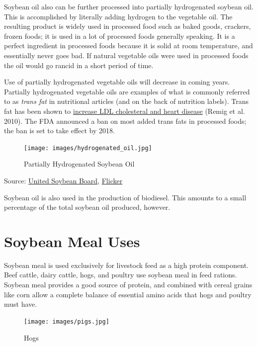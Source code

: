 \documentclass[
  letterpaper,
  DIV=11,
  numbers=noendperiod]{scrreprt}
\begin{document}
Soybean oil also can be further processed into partially hydrogenated
soybean oil. This is accomplished by literally adding hydrogen to the
vegetable oil. The resulting product is widely used in processed food
such as baked goods, crackers, frozen foods; it is used in a lot of
processed foods generally speaking. It is a perfect ingredient in
processed foods because it is solid at room temperature, and essentially
never goes bad. If natural vegetable oils were used in processed foods
the oil would go rancid in a short period of time.

Use of partially hydrogenated vegetable oils will decrease in coming
years. Partially hydrogenated vegetable oils are examples of what is
commonly referred to as \emph{trans fat} in nutritional articles (and on
the back of nutrition labels). Trans fat has been shown to
\href{http://www.fda.gov/ForConsumers/ConsumerUpdates/ucm372915.htm}{increase
LDL cholesteral and heart disease} (Remig et al. 2010). The FDA
announced a ban on most added trans fats in processed foods; the ban is
set to take effect by 2018.

\begin{figure}[H]

{\centering \texttt{[image: images/hydrogenated\_oil.jpg]}

}

\caption{Partially Hydrogenated Soybean Oil}

\end{figure}%

Source: \href{http://unitedsoybean.org/}{United Soybean Board},
\href{https://www.flickr.com/photos/unitedsoybean/16910795086/}{Flicker}

Soybean oil is also used in the production of biodiesel. This amounts to
a small percentage of the total soybean oil produced, however.

\section{Soybean Meal Uses}\label{soybean-meal-uses}

Soybean meal is used exclusively for livestock feed as a high protein
component. Beef cattle, dairy cattle, hogs, and poultry use soybean meal
in feed rations. Soybean meal provides a good source of protein, and
combined with cereal grains like corn allow a complete balance of
essential amino acids that hogs and poultry must have.

\begin{figure}[H]

{\centering \texttt{[image: images/pigs.jpg]}

}

\caption{Hogs}

\end{figure}%
\end{document}

